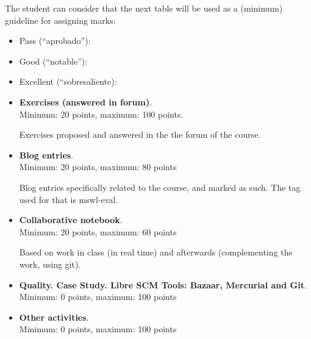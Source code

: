 \documentclass[a4paper]{article}
\begin{document}
The student can consider that the next table will be used as a (minimum) guideline for assigning marks:

\begin{itemize}
\item Pass (``aprobado''): 
\item Good (``notable''): 
\item Excellent (``sobresaliente): 
\end{itemize}

\begin{itemize}
\item \textbf{Exercises (answered in forum)}. \\
  Minimum: 20 points, maximum: 100 points.

  Exercises proposed and answered in the the forum of the course.

\item \textbf{Blog entries}. \\
  Minimum: 20 points, maximum: 80 points

  Blog entries specifically related to the course, and marked as such. The tag used for that is mswl-eval.

\item \textbf{Collaborative notebook}. \\
  Minimum: 20 points, maximum: 60 points

  Based on work in class (in real time) and afterwards (complementing the work, using git).

\item \textbf{Quality. Case Study. Libre SCM Tools: Bazaar, Mercurial and Git}. \\
  Minimum: 0 points, maximum: 100 points

\item \textbf{Other activities}. \\
  Minimum: 0 points, maximum: 100 points

\end{itemize}
\end{document}
